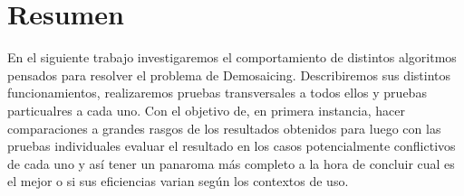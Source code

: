 \section{Resumen}
En el siguiente trabajo investigaremos el comportamiento de distintos algoritmos pensados para resolver el problema de Demosaicing. Describiremos sus distintos funcionamientos, 
realizaremos pruebas transversales a todos ellos y pruebas particualres a cada uno. Con el objetivo de, en primera instancia, hacer comparaciones a grandes rasgos de los resultados obtenidos para luego con 
las pruebas individuales evaluar el resultado en los casos potencialmente conflictivos de cada uno y así tener un panaroma más completo a la hora de concluir cual es el mejor o si sus eficiencias varian según
los contextos de uso.
